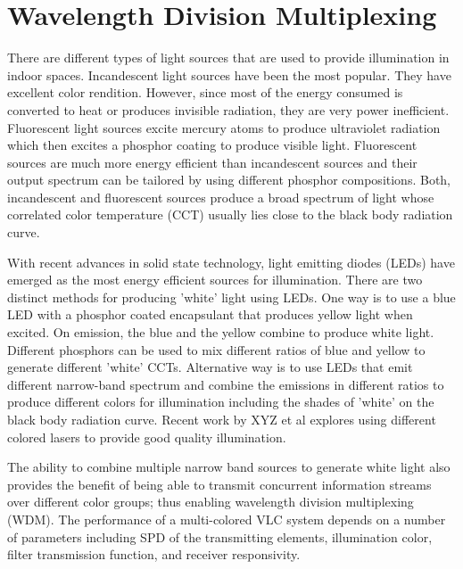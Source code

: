 \section{Wavelength Division Multiplexing}\label{sec:wdm}
There are different types of light sources that are used to provide illumination in indoor spaces. Incandescent light sources have been the most popular. They have excellent color rendition. However, since most of the energy consumed is converted to heat or produces invisible radiation, they are very power inefficient. Fluorescent light sources excite mercury atoms to produce ultraviolet radiation which then excites a phosphor coating to produce visible light. Fluorescent sources are much more energy efficient than incandescent sources and their output spectrum can be tailored by using different phosphor compositions. Both, incandescent and fluorescent sources produce a broad spectrum of light whose correlated color temperature (CCT) usually lies close to the black body radiation curve. 

With recent advances in solid state technology, light emitting diodes (LEDs) have emerged as the most energy efficient sources for illumination. There are two distinct methods for producing 'white' light using LEDs. One way is to use a blue LED with a phosphor coated encapsulant that produces yellow light when excited. On emission, the blue and the yellow combine to produce white light. Different phosphors can be used to mix different ratios of blue and yellow to generate different 'white' CCTs. Alternative way is to use LEDs that emit different narrow-band spectrum and combine the emissions in different ratios to produce different colors for illumination including the shades of 'white' on the black body radiation curve. Recent work by {\color{red}XYZ et al} explores using different colored lasers to provide good quality illumination.

The ability to combine multiple narrow band sources to generate white light also provides the benefit of being able to transmit concurrent information streams over different color groups; thus enabling wavelength division multiplexing (WDM). The performance of a multi-colored VLC system depends on a number of parameters including SPD of the transmitting elements, illumination color, filter transmission function, and receiver responsivity.

